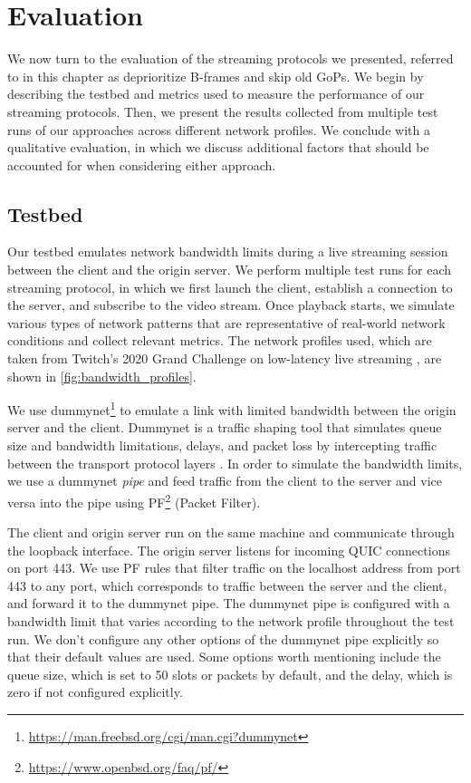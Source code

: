 
\chapter{Evaluation}\label{chapter:evaluation}
We now turn to the evaluation of the streaming protocols we presented, referred to in this chapter as deprioritize B-frames and skip old \acp{GoP}. We begin by describing the testbed and metrics used to measure the performance of our streaming protocols. Then, we present the results collected from multiple test runs of our approaches across different network profiles. We conclude with a qualitative evaluation, in which we discuss additional factors that should be accounted for when considering either approach.

\section{Testbed}
Our testbed emulates network bandwidth limits during a live streaming session between the client and the origin server. We perform multiple test runs for each streaming protocol, in which we first launch the client, establish a connection to the server, and subscribe to the video stream. Once playback starts, we simulate various types of network patterns that are representative of real-world network conditions and collect relevant metrics. The network profiles used, which are taken from Twitch's 2020 Grand Challenge on low-latency live streaming \parencite{twitchGrandChallengeAdaptation}, are shown in \autoref{fig:bandwidth_profiles}.



We use dummynet\footnote{\url{https://man.freebsd.org/cgi/man.cgi?dummynet}} to emulate a link with limited bandwidth between the origin server and the client. Dummynet is a traffic shaping tool that simulates queue size and bandwidth limitations, delays, and packet loss by intercepting traffic between the transport protocol layers \parencite{rizzoDummynetSimpleApproach1997}. %
In order to simulate the bandwidth limits, we use a dummynet \textit{pipe} and feed traffic from the client to the server and vice versa into the pipe using PF\footnote{\url{https://www.openbsd.org/faq/pf/}} (Packet Filter).

The client and origin server run on the same machine and communicate through the loopback interface. The origin server listens for incoming QUIC connections on port 443. We use PF rules that filter traffic on the localhost address from port 443 to any port, which corresponds to traffic between the server and the client, and forward it to the dummynet pipe. The dummynet pipe is configured with a bandwidth limit that varies according to the network profile throughout the test run. We don't configure any other options of the dummynet pipe explicitly so that their default values are used. Some options worth mentioning include the queue size, which is set to 50 slots or packets by default, and the delay, which is zero if not configured explicitly.


